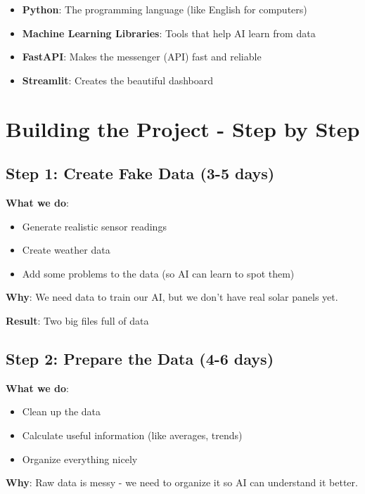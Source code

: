 \documentclass[12pt,a4paper]{article}
\begin{document}
\begin{itemize}[leftmargin=*]
    \item \textbf{Python}: The programming language (like English for computers)
    \item \textbf{Machine Learning Libraries}: Tools that help AI learn from data
    \item \textbf{FastAPI}: Makes the messenger (API) fast and reliable
    \item \textbf{Streamlit}: Creates the beautiful dashboard
\end{itemize}

\newpage

\section{Building the Project - Step by Step}

\subsection{Step 1: Create Fake Data (3-5 days)}

\textbf{What we do}:
\begin{itemize}[leftmargin=*]
    \item Generate realistic sensor readings
    \item Create weather data
    \item Add some problems to the data (so AI can learn to spot them)
\end{itemize}

\textbf{Why}: We need data to train our AI, but we don't have real solar panels yet.

\textbf{Result}: Two big files full of data

\subsection{Step 2: Prepare the Data (4-6 days)}

\textbf{What we do}:
\begin{itemize}[leftmargin=*]
    \item Clean up the data
    \item Calculate useful information (like averages, trends)
    \item Organize everything nicely
\end{itemize}

\textbf{Why}: Raw data is messy - we need to organize it so AI can understand it better.
\end{document}
